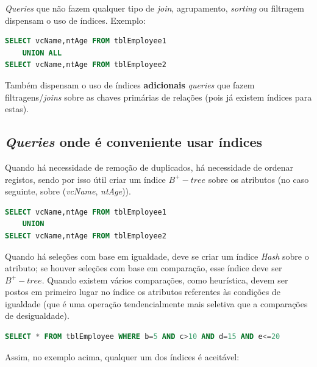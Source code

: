 \documentclass[oneside]{book}
\theoremstyle{definition}
\begin{document}
\textit{Queries} que não fazem qualquer tipo de \textit{join}, agrupamento, \textit{sorting} ou filtragem dispensam o uso de índices. Exemplo:

\begin{lstlisting}[language=SQL, morekeywords={CALL, DECLARE, PROCEDURE, IF}, framesep=8pt, xleftmargin=40pt, framexleftmargin=40pt, frame=tb, framerule=0pt]
SELECT vcName,ntAge FROM tblEmployee1 
    UNION ALL
SELECT vcName,ntAge FROM tblEmployee2
\end{lstlisting}

Também dispensam o uso de índices \textbf{adicionais} \textit{queries} que fazem filtragens/\textit{joins} sobre as chaves primárias de relações (pois já existem índices para estas).

\subsection{\textit{Queries} onde é conveniente usar índices}

Quando há necessidade de remoção de duplicados, há necessidade de ordenar registos, sendo por isso útil criar um índice $B^{+}-tree$ sobre os atributos (no caso seguinte, sobre (\textit{vcName}, \textit{ntAge})).

\begin{lstlisting}[language=SQL, morekeywords={CALL, DECLARE, PROCEDURE, IF}, framesep=8pt, xleftmargin=40pt, framexleftmargin=40pt, frame=tb, framerule=0pt]
SELECT vcName,ntAge FROM tblEmployee1 
    UNION
SELECT vcName,ntAge FROM tblEmployee2
\end{lstlisting}

Quando há seleções com base em igualdade, deve se criar um índice \textit{Hash} sobre o atributo; se houver seleções com base em comparação, esse índice deve ser $B^{+}-tree$. Quando existem vários comparações, como heurística, devem ser postos em primeiro lugar no índice os atributos referentes às condições de igualdade (que é uma operação tendencialmente mais seletiva que a comparações de desigualdade). 

\begin{lstlisting}[language=SQL, morekeywords={CALL, DECLARE, PROCEDURE, IF}, framesep=8pt, xleftmargin=40pt, framexleftmargin=40pt, frame=tb, framerule=0pt]
SELECT * FROM tblEmployee WHERE b=5 AND c>10 AND d=15 AND e<=20
\end{lstlisting}

Assim, no exemplo acima, qualquer um dos índices é aceitável:
\end{document}
